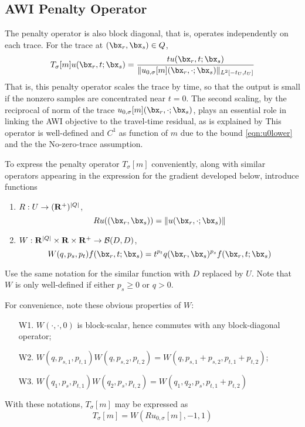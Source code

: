 \subsection{AWI Penalty Operator}
The penalty operator is also block diagonal, that is, operates independently on each trace. For the trace at $(\bx_r,\bx_s) \in Q$, 
\begin{equation}
  \label{eqn:ppf}
  T_{\sigma}[m]u (\bx_r,t;\bx_s) = \frac{t u(\bx_r,t;\bx_s)}{\|u_{0,\sigma}[m](\bx_r,\cdot; \bx_s)\|_{L^2[-t_U,t_U]} }
\end{equation}
That is, this penalty operator scales the trace by time, so that the output is small if the nonzero samples are concentrated near $t=0$. The second scaling, by the reciprocal of norm of the trace $u_{0,\sigma}[m](\bx_r,\cdot;\bx_s)$, plays an essential role in linking the AWI objective to the travel-time residual, as is explained by \cite{HCSMWS:23a}
This operator is well-defined and $C^1$ as function of $m$ due to the
bound \ref{eqn:u0lower} and the the No-zero-trace assumption.

To express the penalty operator $T_{\sigma}[m]$ conveniently, along
with similar operators appearing in the expression for the gradient
developed below, introduce functions
\begin{enumerate}
\item $R: U \rightarrow ({\bf R}^{+})^{|Q|}$,
  \[
    Ru((\bx_r,\bx_s)) = \|u(\bx_r, \cdot;\bx_s)\|
  \]
\item $W: {\bf R}^{|Q|} \times {\bf R} \times {\bf R}^{+}
  \rightarrow {\cal B}(D,D)$,
  \[
    W(q,p_s, p_t)f (\bx_r,t;\bx_s) = t^{p_t}
    q(\bx_r,\bx_s)^{p_s}f(\bx_r,t;\bx_s)
  \]
\end{enumerate}
Use the same notation for the similar function with $D$ replaced by
$U$. Note that $W$ is only well-defined if either $p_s \ge 0$ or
$q>0$.

For convenience, note these obvious properties of $W$:
\begin{itemize}
\item[W1. ] $W(\cdot,\cdot,0)$ is block-scalar, hence commutes with any
  block-diagonal operator;
\item[W2. ] $W(q,p_{s,1},p_{t,1})W(q,p_{s,2},p_{t,2}) = W(q,p_{s,1}+p_{s,2},p_{t,1}+p_{t,2})$;
\item[W3. ] $W(q_1,p_s,p_{t,1})W(q_2,p_s,p_{t,2}) = W(q_1,q_2,
  p_s,p_{t,1}+p_{t,2})$
\end{itemize}

With these notations, $T_{\sigma}[m]$ may be expressed as
\begin{equation}
  \label{eqn:talt}
  T_{\sigma}[m] = W(Ru_{0,\sigma}[m],-1, 1)
\end{equation}


